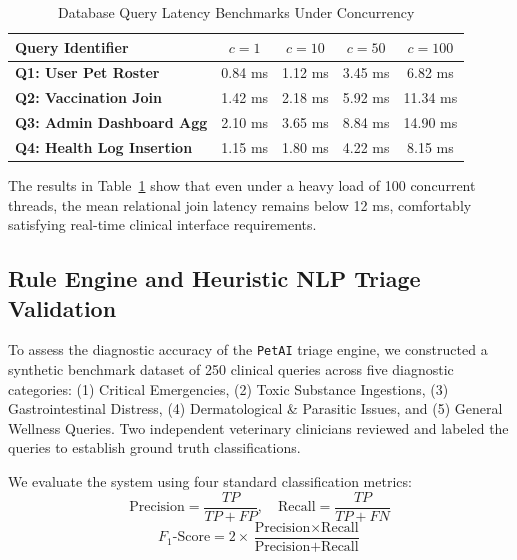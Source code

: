 \documentclass[conference]{IEEEtran}
\begin{document}
\begin{table}[h]
\caption{Database Query Latency Benchmarks Under Concurrency}
\label{tab:db_benchmarks}
\centering
\begin{tabular}{lcccc}
\toprule
\textbf{Query Identifier} & \textbf{$c=1$} & \textbf{$c=10$} & \textbf{$c=50$} & \textbf{$c=100$} \\
\midrule
\textbf{Q1: User Pet Roster} & 0.84 ms & 1.12 ms & 3.45 ms & 6.82 ms \\
\textbf{Q2: Vaccination Join} & 1.42 ms & 2.18 ms & 5.92 ms & 11.34 ms \\
\textbf{Q3: Admin Dashboard Agg} & 2.10 ms & 3.65 ms & 8.84 ms & 14.90 ms \\
\textbf{Q4: Health Log Insertion} & 1.15 ms & 1.80 ms & 4.22 ms & 8.15 ms \\
\bottomrule
\end{tabular}
\end{table}

The results in Table~\ref{tab:db_benchmarks} show that even under a heavy load of 100 concurrent threads, the mean relational join latency remains below 12 ms, comfortably satisfying real-time clinical interface requirements.

\subsection{Rule Engine and Heuristic NLP Triage Validation}
To assess the diagnostic accuracy of the \texttt{PetAI} triage engine, we constructed a synthetic benchmark dataset of 250 clinical queries across five diagnostic categories: (1) Critical Emergencies, (2) Toxic Substance Ingestions, (3) Gastrointestinal Distress, (4) Dermatological \& Parasitic Issues, and (5) General Wellness Queries. Two independent veterinary clinicians reviewed and labeled the queries to establish ground truth classifications.

We evaluate the system using four standard classification metrics:
\begin{equation}
\text{Precision} = \frac{TP}{TP + FP}, \quad \text{Recall} = \frac{TP}{TP + FN}
\end{equation}
\begin{equation}
F_1\text{-Score} = 2 \times \frac{\text{Precision} \times \text{Recall}}{\text{Precision} + \text{Recall}}
\end{equation}
\end{document}
